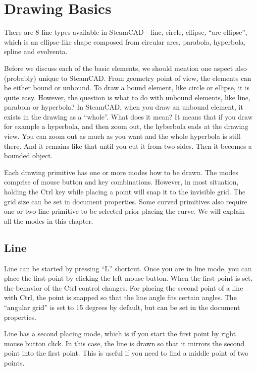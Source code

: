 \chapter{Drawing Basics}\label{chap:chap1}

There are 8 line types available in SteamCAD - line, circle, ellipse, ``arc ellipse'',
which is an ellipse-like shape composed from circular arcs, parabola, hyperbola,
spline and evolventa.

Before we discuss each of the basic elements, we should mention one aspect also
(probably) unique to SteamCAD. From geometry point of view, the elements can be either
bound or unbound. To draw a bound element, like circle or ellipse, it is quite easy.
However, the question is what to do with unbound elements, like line, parabola or
hyperbola? In SteamCAD, when you draw an unbound element, it exists in the drawing
as a ``whole''. What does it mean? It means that if you draw for example a hyperbola,
and then zoom out, the hyberbola ends at the drawing view. You can zoom out as
much as you want and the whole hyperbola is still there. And it remains like that
until you cut it from two sides. Then it becomes a bounded object.

Each drawing primitive has one or more modes how to be drawn. The modes comprise of
mouse button and key combinations. However, in most situation, holding the Ctrl key
while placing a point will snap it to the invisible grid. The grid size can be set
in document properties. Some curved primitives also require one or two line primitive
to be selected prior placing the curve. We will explain all the modes in this chapter.

\section{Line}\label{draw:line}

Line can be started by pressing ``L'' shortcut. Once you are in line mode, you can place
the first point by clicking the left mouse button. When the first point is set, the
behavior of the Ctrl control changes. For placing the second point of a line with Ctrl,
the point is snapped so that the line angle fits certain angles. The ``angular grid''
is set to 15 degrees by default, but can be set in the document properties.

Line has a second placing mode, which is if you start the first point by right mouse
button click. In this case, the line is drawn so that it mirrors the second point into
the first point. This is useful if you need to find a middle point of two points.

